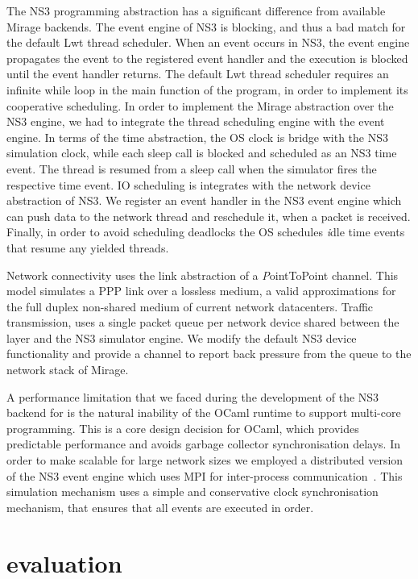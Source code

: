 The NS3 programming abstraction has a significant difference from available
Mirage backends. The event engine of NS3 is blocking, and thus a bad match for
the default Lwt thread scheduler. When an event occurs in NS3, the event engine
propagates the event to the registered event handler and the execution is
blocked until the event handler returns. The default Lwt thread scheduler
requires an infinite while loop in the main function of the program, in order to
implement its cooperative scheduling.  In order to implement the Mirage
abstraction over the NS3 engine, we had to integrate the thread scheduling
engine with the event engine. In terms of the time abstraction, the OS clock is
bridge with the NS3 simulation clock, while each sleep call is blocked and
scheduled as an NS3 time event. The thread is resumed from a sleep call when the
simulator fires the respective time event.  IO scheduling is integrates with the
network device abstraction of NS3. We register an event handler in the NS3 event
engine which can push data to the network thread and reschedule it, when a
packet is received. Finally, in order to avoid scheduling deadlocks the OS
schedules {\emph idle} time events that resume any yielded threads.

Network connectivity uses the link abstraction of a {\emph PointToPoint
  channel}. This model simulates a PPP link over a lossless medium, a valid
approximations for the full duplex non-shared medium of current network
datacenters. Traffic transmission, uses a single packet queue per network device
shared between the \mirage layer and the NS3 simulator engine.  We modify
the default NS3 device functionality and provide a channel to
report back pressure from the queue to the network stack of Mirage.

A performance limitation that we faced during the development of the NS3 backend
for \sdnsim is the natural inability of the OCaml runtime to support
multi-core programming. This is a core design decision for OCaml, which
provides predictable performance and avoids garbage collector synchronisation
delays. In order to make \sdnsim scalable for large network sizes we employed a
distributed version of the NS3 event engine which uses MPI for inter-process
communication~\cite{Pelkey:2011ua}. This simulation mechanism uses a simple and
conservative clock synchronisation mechanism, that ensures that all events are
executed in order. 


\section{\sdnsim evaluation} \label{sec:sdnsim-precision}

